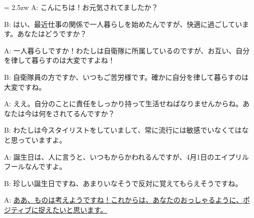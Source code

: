 \documentclass[11pt]{amsart}
\title{}
\author{}
\newenvironment{hangall}[1]{\hangindent = 2.5zw\everypar{\hangindent = 2.5zw}}{}
\begin{document}
\maketitle
\begin{hangall}{}%
A: こんにちは！お元気されてましたか？

B: はい、最近仕事の関係で一人暮らしを始めたんですが、快適に過ごしています。あなたはどうですか？

A: 一人暮らしですか！わたしは自衛隊に所属しているのですが、お互い、自分を律して暮らすのは大変ですよね！

B: 自衛隊員の方ですか、いつもご苦労様です。確かに自分を律して暮らすのは大変ですね。

A: ええ。自分のことに責任をしっかり持って生活せねばなりませんからね。あなたは今は何をされてるんですか？

B: わたしは今スタイリストをしていまして、常に流行には敏感でいなくてはなと思っていますよ。

A: 誕生日は、人に言うと、いつもからかわれるんですが、4月1日のエイプリルフールなんですよ。

B: 珍しい誕生日ですね、あまりいなそうで反対に覚えてもらえそうですね。

A: \ul{ああ、ものは考えようですね！これからは、あなたのおっしゃるように、ポジティブに捉えたいと思います。}\end{hangall}
\end{document}
